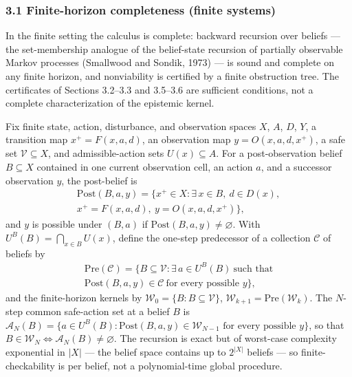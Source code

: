 \documentclass[10pt,twocolumn]{article}
\theoremstyle{definition}
\begin{document}
\subsubsection{3.1 Finite-horizon completeness (finite systems)}\label{calc-finite-horizon-completeness}

In the finite setting the calculus is complete: backward recursion over beliefs --- the set-membership analogue of the belief-state recursion of partially observable Markov processes (Smallwood and Sondik, 1973) --- is sound and complete on any finite horizon, and nonviability is certified by a finite obstruction tree. The certificates of Sections 3.2--3.3 and 3.5--3.6 are sufficient conditions, not a complete characterization of the epistemic kernel.

Fix finite state, action, disturbance, and observation spaces \(X\),
\(A\), \(D\), \(Y\), a transition map \(x^+ = F(x,a,d)\), an observation
map \(y = O(x,a,d,x^+)\), a safe set \(\mathcal V\subseteq X\), and
admissible-action sets \(U(x)\subseteq A\). For a post-observation belief \(B\subseteq X\) contained in one
current observation cell, an action \(a\), and a successor observation
\(y\), the post-belief is
\[
\begin{gathered}
\mathrm{Post}(B,a,y) = \bigl\{ x^+\in X : \exists\, x\in B,\ d\in D(x), \\
x^+ = F(x,a,d),\ y = O(x,a,d,x^+) \bigr\},
\end{gathered}
\]
and \(y\) is possible under \((B,a)\) if \(\mathrm{Post}(B,a,y)\neq\varnothing\).
With \(U^B(B)=\bigcap_{x\in B}U(x)\), define the one-step predecessor of a
collection \(\mathcal C\) of beliefs by
\[
\begin{gathered}
\mathrm{Pre}(\mathcal C) = \bigl\{ B\subseteq\mathcal V : \exists\, a\in U^B(B)\ \text{such that}\\
\mathrm{Post}(B,a,y)\in\mathcal C\ \text{for every possible } y \bigr\},
\end{gathered}
\]
and the finite-horizon kernels by \(\mathcal W_0 = \{B : B\subseteq\mathcal V\}\),
\(\mathcal W_{k+1} = \mathrm{Pre}(\mathcal W_k)\).
The \(N\)-step common safe-action set at a belief \(B\) is
\(\mathcal{A}_N(B) = \bigl\{ a \in U^B(B) : \mathrm{Post}(B,a,y) \in \mathcal W_{N-1} \text{ for every possible } y \bigr\}\),
so that \(B \in \mathcal W_N \iff \mathcal{A}_N(B) \neq \varnothing\). The recursion is exact but of worst-case complexity exponential in
\(|X|\) --- the belief space contains up to \(2^{|X|}\) beliefs --- so
finite-checkability is per belief, not a polynomial-time global procedure.
\end{document}
